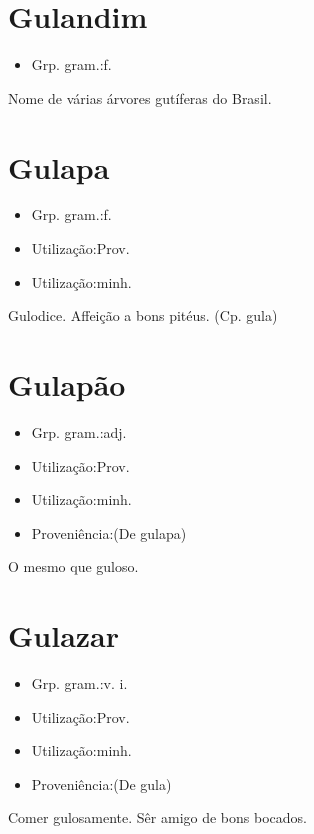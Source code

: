 \section{Gulandim}
\begin{itemize}
\item {Grp. gram.:f.}
\end{itemize}
Nome de várias árvores gutíferas do Brasil.
\section{Gulapa}
\begin{itemize}
\item {Grp. gram.:f.}
\end{itemize}
\begin{itemize}
\item {Utilização:Prov.}
\end{itemize}
\begin{itemize}
\item {Utilização:minh.}
\end{itemize}
Gulodice.
Affeição a bons pitéus.
(Cp. \textunderscore gula\textunderscore )
\section{Gulapão}
\begin{itemize}
\item {Grp. gram.:adj.}
\end{itemize}
\begin{itemize}
\item {Utilização:Prov.}
\end{itemize}
\begin{itemize}
\item {Utilização:minh.}
\end{itemize}
\begin{itemize}
\item {Proveniência:(De \textunderscore gulapa\textunderscore )}
\end{itemize}
O mesmo que \textunderscore guloso\textunderscore .
\section{Gulazar}
\begin{itemize}
\item {Grp. gram.:v. i.}
\end{itemize}
\begin{itemize}
\item {Utilização:Prov.}
\end{itemize}
\begin{itemize}
\item {Utilização:minh.}
\end{itemize}
\begin{itemize}
\item {Proveniência:(De \textunderscore gula\textunderscore )}
\end{itemize}
Comer gulosamente.
Sêr amigo de bons bocados.
